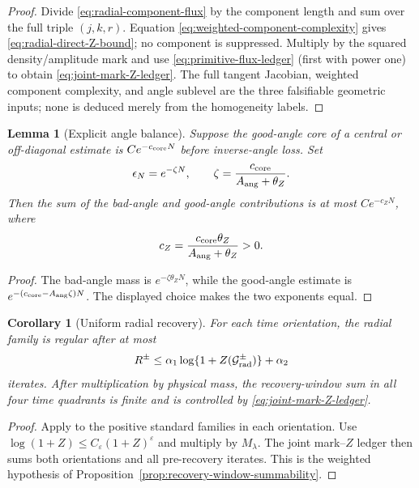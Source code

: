 \documentclass[11pt]{article}
\newtheorem{lemma}[theorem]{Lemma}
\newtheorem{corollary}[theorem]{Corollary}
\begin{document}
\begin{proof}
Divide \eqref{eq:radial-component-flux} by the component length and sum over
the full triple $(j,k,r)$.  Equation
\eqref{eq:weighted-component-complexity} gives
\eqref{eq:radial-direct-Z-bound}; no component is suppressed.  Multiply by
the squared density/amplitude mark and use
\eqref{eq:primitive-flux-ledger} (first with power one) to obtain
\eqref{eq:joint-mark-Z-ledger}.  The full tangent Jacobian, weighted
component complexity, and angle sublevel are the three falsifiable geometric
inputs; none is deduced merely from the homogeneity labels.
\end{proof}

\begin{lemma}[Explicit angle balance]
\label{lem:FZ-angle-balance}
Suppose the good-angle core of a central or off-diagonal estimate is
$Ce^{-c_{\rm core}N}$ before inverse-angle loss.  Set
\[
 \epsilon_N=e^{-\zeta N},\qquad
 \zeta=\frac{c_{\rm core}}{A_{\rm ang}+\theta_Z}.
\]
Then the sum of the bad-angle and good-angle contributions is at most
$Ce^{-c_ZN}$, where
\begin{equation}
\label{eq:explicit-cZ}
 c_Z=\frac{c_{\rm core}\theta_Z}
 {A_{\rm ang}+\theta_Z}>0.
\end{equation}
\end{lemma}

\begin{proof}
The bad-angle mass is $e^{-\zeta\theta_ZN}$, while the good-angle estimate is
$e^{-(c_{\rm core}-A_{\rm ang}\zeta)N}$.  The displayed choice makes the two
exponents equal.
\end{proof}

\begin{corollary}[Uniform radial recovery]
\label{cor:radial-bi-recovery}
For each time orientation, the radial family is regular after at most
\begin{equation}
\label{eq:radial-log-Z-recovery}
 R^\pm\le \alpha_1\log\{1+Z(\mathcal G_{\rm rad}^\pm)\}+\alpha_2
\end{equation}
iterates.  After multiplication by physical mass, the recovery-window sum in
all four time quadrants is finite and is controlled by
\eqref{eq:joint-mark-Z-ledger}.
\end{corollary}

\begin{proof}
Apply \cite[Corollary~6.15(c)]{CanestrariHoles} to the positive standard
families in each orientation.  Use
$\log(1+Z)\le C_\varepsilon(1+Z)^\varepsilon$ and multiply by
$M_\lambda$.  The joint mark--$Z$ ledger then sums both orientations and all
pre-recovery iterates.  This is the weighted hypothesis of
Proposition~\ref{prop:recovery-window-summability}.
\end{proof}
\end{document}
